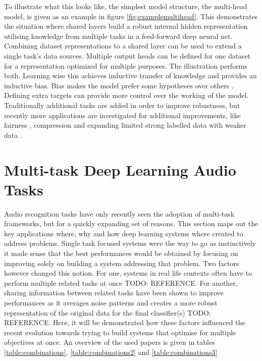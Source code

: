 To illustrate what this looks like, the simplest model structure, the multi-head model, is given as an example in figure \ref{fig:examplemultihead}. This demonstrates the situation where shared layers build a robust internal hidden representation utilising knowledge from multiple tasks in a feed-forward deep neural net. Combining dataset representations to a shared layer can be used to extend a single task's data sources. Multiple output heads can be defined for one dataset for a representation optimized for multiple purposes. The illustration performs both. Learning wise this achieves inductive transfer of knowledge and provides an inductive bias. Bias makes the model prefer some hypotheses over others \cite{caruana1997multitask}. Defining extra targets can provide more control over the working of the model. Traditionally additional tasks are added in order to improve robustness, but recently more applications are investigated for additional improvements, like fairness \citep{oneto2019taking}, compression \citep{georgiev2017heterogeneous} and expanding limited strong labelled data with weaker data \cite{lee2019label}.\\




\section{Multi-task Deep Learning Audio Tasks}

Audio recognition tasks have only recently seen the adoption of multi-task frameworks, but for a quickly expanding set of reasons. This section maps out the key applications where, why and how deep learning systems where created to address problems. Single task focused systems were the way to go as instinctively it made sense that the best performances would be obtained by focusing on improving solely on building a system addressing that problem. Two factors however changed this notion. For one, systems in real life contexts often have to perform multiple related tasks at once TODO: REFERENCE. For another, sharing information between related tasks have been shown to improve performances as it averages noise patterns and creates a more robust representation of the original data for the final classifier(s) TODO: REFERENCE. Here, it will be demonstrated how these factors influenced the recent evolution towards trying to build systems that optimise for multiple objectives at once. An overview of the used papers is given in tables \ref{table:combinations}, \ref{table:combinations2} and \ref{table:combinations3} \\

